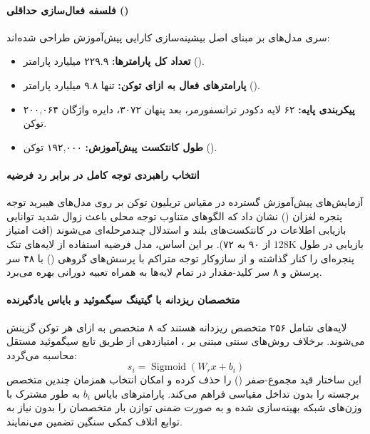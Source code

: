 \item {}

\paragraph*{فلسفه فعال‌سازی حداقلی ()}
سری مدل‌های  \cite{minimax_m2_2026} بر مبنای اصل بیشینه‌سازی کارایی پیش‌آموزش طراحی شده‌اند:
\begin{itemize}
    \item \textbf{تعداد کل پارامترها:} ۲۲۹.۹ میلیارد پارامتر ().
    \item \textbf{پارامترهای فعال به ازای توکن:} تنها ۹.۸ میلیارد پارامتر ().
    \item \textbf{پیکربندی پایه:} ۶۲ لایه دکودر ترانسفورمر، بعد پنهان ۳۰۷۲، دایره واژگان ۲۰۰,۰۶۴ توکن.
    \item \textbf{طول کانتکست پیش‌آموزش:} ۱۹۲,۰۰۰ توکن ().
\end{itemize}

\paragraph*{انتخاب راهبردی توجه کامل در برابر رد فرضیه }
آزمایش‌های پیش‌آموزش گسترده در مقیاس تریلیون توکن بر روی مدل‌های هیبرید توجه پنجره لغزان () \cite{minimax_m2_2026} نشان داد که الگوهای متناوب توجه محلی باعث زوال شدید توانایی بازیابی اطلاعات در کانتکست‌های بلند و استدلال چندمرحله‌ای می‌شوند (افت امتیاز بازیابی  در طول $128\text{K}$ از ۹۰ به ۷۲). بر این اساس، مدل  فرضیه استفاده از لایه‌های تنک پنجره‌ای را کنار گذاشته و از سازوکار توجه متراکم با پرسش‌های گروهی () با ۴۸ سر پرسش و ۸ سر کلید-مقدار در تمام لایه‌ها به همراه تعبیه دورانی  بهره می‌برد.

\paragraph*{متخصصان ریزدانه با گیتینگ سیگموئید و بایاس یادگیرنده}
لایه‌های  شامل ۲۵۶ متخصص ریزدانه هستند که ۸ متخصص به ازای هر توکن گزینش می‌شوند. برخلاف روش‌های سنتی مبتنی بر ، امتیازدهی از طریق تابع سیگموئید مستقل محاسبه می‌گردد:
\begin{equation}
    s_i = \operatorname{Sigmoid}(W_r x + b_i)
\end{equation}
این ساختار قید مجموع-صفر () را حذف کرده و امکان انتخاب همزمان چندین متخصص برجسته را بدون تداخل مقیاسی فراهم می‌کند. پارامترهای بایاس $b_i$ به طور مشترک با وزن‌های شبکه بهینه‌سازی شده و به صورت ضمنی توازن بار متخصصان را بدون نیاز به توابع اتلاف کمکی سنگین تضمین می‌نمایند.

